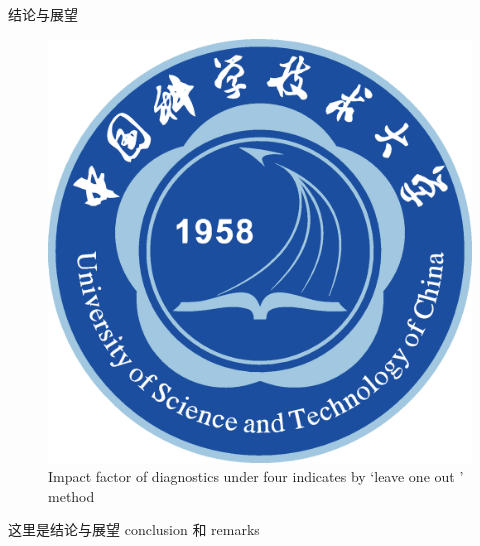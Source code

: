 \documentclass[8pt,compress,t,notheorems,noamsthm,notheorem,xcolor=x11names]{beamer}
\theoremstyle{nonumberplain}%
\theoremstyle{plain}
\begin{document}
\begin{frame}{结论与展望}
\begin{figure}[htbp]
	\centering
	\includegraphics[scale=0.1]{ustc_logo_fig_new}
	\caption{Impact factor of diagnostics under four indicates by `leave one out ' method}
	\label{fig1}
\end{figure}
这里是结论与展望 conclusion 和 remarks

\end{frame}


\end{document}
